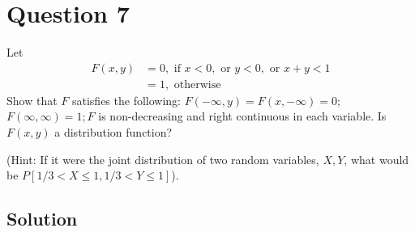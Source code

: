 \section*{Question 7}

Let
\begin{align*}
    F(x, y)
     & =
    0, \text { if } x<0,
    \text { or } y<0,
    \text { or } x+y<1
    \\ & =
    1, \text { otherwise }
\end{align*}
Show that \( F \) satisfies the following: \( F(-\infty, y)=F(x,-\infty)=0 \); \( F(\infty, \infty)=1 ; F \) is non-decreasing and right continuous in each variable.
Is \( F(x, y) \) a distribution function?

(Hint: If it were the joint distribution of two random variables, \( X, Y \), what would be \( P[1 / 3<X \leq 1,1 / 3<Y \leq 1] \)).

\subsection*{Solution}
